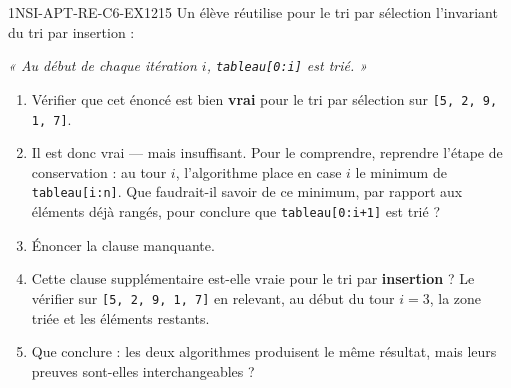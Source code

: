 

\begin{exercice}{1NSI-APT-RE-C6-EX1}{2}{15}
Un élève réutilise pour le tri par sélection l'invariant du tri par insertion :

\medskip
\emph{« Au début de chaque itération $i$, \lstinline{tableau[0:i]} est trié. »}
\medskip

\begin{enumerate}
  \item Vérifier que cet énoncé est bien \textbf{vrai} pour le tri par sélection sur
    \lstinline{[5, 2, 9, 1, 7]}.
  \item Il est donc vrai — mais insuffisant. Pour le comprendre, reprendre l'étape de
    conservation : au tour $i$, l'algorithme place en case $i$ le minimum de
    \lstinline{tableau[i:n]}. Que faudrait-il savoir de ce minimum, par rapport aux
    éléments déjà rangés, pour conclure que \lstinline{tableau[0:i+1]} est trié ?
  \item Énoncer la clause manquante.
  \item Cette clause supplémentaire est-elle vraie pour le tri par \textbf{insertion} ?
    Le vérifier sur \lstinline{[5, 2, 9, 1, 7]} en relevant, au début du tour $i=3$, la
    zone triée et les éléments restants.
  \item Que conclure : les deux algorithmes produisent le même résultat, mais leurs
    preuves sont-elles interchangeables ?
\end{enumerate}
\end{exercice}

